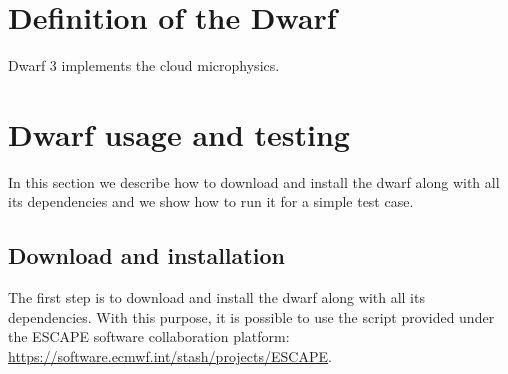 \documentclass[
a4paper,     %
12pt,        %
article,
onecolumn,   %
openany,     %
]{memoir}
\begin{document}
\section{Definition of the Dwarf}
Dwarf 3 implements the cloud microphysics.



\section{Dwarf usage and testing}
In this section we describe how to download and install 
the dwarf along with all its dependencies and we show 
how to run it for a simple test case.



\subsection{Download and installation}
The first step is to download and install the dwarf along 
with all its dependencies. With this purpose, it is possible 
to use the script provided under the ESCAPE software collaboration 
platform:\\
\url{https://software.ecmwf.int/stash/projects/ESCAPE}.
\end{document}
